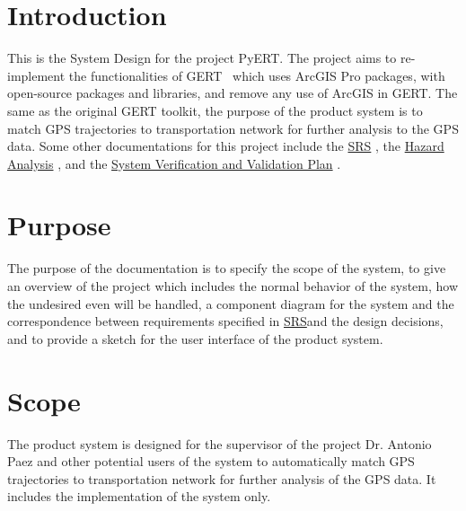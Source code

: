 \documentclass[12pt, titlepage]{article}
\begin{document}
\section{Introduction}
This is the System Design for the project PyERT. The project aims to re-implement the functionalities of GERT~\citep{DALUMPINES2018121} which uses ArcGIS Pro packages, with
open-source packages and libraries, and remove any use of ArcGIS in GERT. The same as the original GERT toolkit, the purpose of the product system is to match GPS trajectories to transportation network for further analysis to the GPS data. Some other documentations for this project include the \href{https://github.com/paezha/PyERT-BLACK/blob/main/docs/SRS/SRS.pdf}{SRS} \citep{SRS}, the \href{https://github.com/paezha/PyERT-BLACK/blob/main/docs/HazardAnalysis/HazardAnalysis.pdf}{Hazard Analysis} \citep{HazardAnalysis}, and the \href{https://github.com/paezha/PyERT-BLACK/blob/main/docs/VnVPlan/VnVPlan.pdf}{System Verification and Validation Plan} \citep{VnVPlan}.


\section{Purpose}


The purpose of the documentation is to specify the scope of the system, to give an overview of the project which includes the normal behavior of the system, how the undesired even will be handled, a component diagram for the system and the correspondence between requirements specified in \href{https://github.com/paezha/PyERT-BLACK/blob/main/docs/SRS/SRS.pdf}{SRS}\citep{SRS}and the design decisions, and to provide a sketch for the user interface of the product system.

\section{Scope}

The product system is designed for the supervisor of the project Dr. Antonio Paez and other potential users of the system to automatically match GPS trajectories to transportation network for further analysis of the GPS data. It includes the implementation of the system only. 
\end{document}
